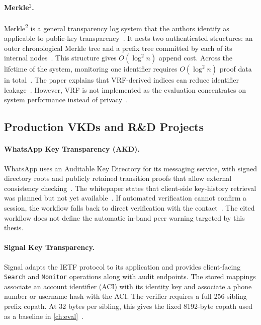 \paragraph{Merkle\texorpdfstring{$^2$}{2}.}
Merkle\textsuperscript{2} is a general transparency log system that the authors identify as
applicable to public-key transparency~\cite[Sections~I and~XI]{hu2021merkle2}. It nests two
authenticated structures: an outer chronological Merkle tree and a prefix tree committed by each of
its internal nodes~\cite[Section~IV]{hu2021merkle2}. This structure gives $O(\log^2 n)$ append cost.
Across the lifetime of the system, monitoring one identifier requires $O(\log^2 n)$ proof data in
total~\cite[Table~I and Section~V]{hu2021merkle2}. The paper explains that VRF-derived indices
can reduce identifier leakage~\cite[Section~VII-B]{hu2021merkle2}. However, VRF is not implemented
as the evaluation concentrates on system performance instead of
privacy~\cite[Section~VIII]{hu2021merkle2}.

\subsection{Production VKDs and R\&D Projects}

\paragraph{WhatsApp Key Transparency (AKD).}
WhatsApp uses an Auditable Key Directory for its messaging service, with signed directory roots
and publicly retained transition proofs that allow external consistency
checking~\cite{whatsapp2023whitepaper}. The whitepaper states that client-side key-history retrieval
was planned but not yet available~\cite{whatsapp2023whitepaper}. If automated verification cannot
confirm a session, the workflow falls back to direct verification with the
contact~\cite{whatsapp2023whitepaper}. The cited workflow
does not define the automatic in-band peer warning targeted by this thesis.

\paragraph{Signal Key Transparency.}
Signal adapts the IETF protocol to its application and provides client-facing
\texttt{Search} and \texttt{Monitor} operations along with audit endpoints. The stored
mappings associate an account identifier (ACI) with its identity key and associate a phone number or
username hash with the ACI. The verifier requires a full 256-sibling prefix copath. At 32 bytes per
sibling, this gives the fixed \num{8192}-byte copath used as a baseline in
\cref{ch:eval}~\cite{signal-kt-server}.

